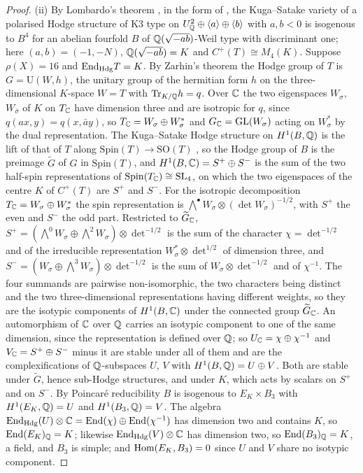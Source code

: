 \begin{proof}
(ii) By Lombardo's theorem \cite[Thms.~6.2, 6.4]{Lom01}, in the form of \cite[Thm.~4.1]{Var25}, the Kuga--Satake variety of a polarised Hodge structure of K3 type on $U_{\mathbb{Q}}^{2}\oplus\langle a\rangle\oplus\langle b\rangle$ with $a,b<0$ is isogenous to $B^{4}$ for an abelian fourfold $B$ of $\mathbb{Q}(\sqrt{-ab})$-Weil type with discriminant one; here $(a,b)=(-1,-N)$, $\mathbb{Q}(\sqrt{-ab})=K$ and $C^{+}(T)\cong M_{4}(K)$. Suppose $\rho(X)=16$ and $\mathrm{End}_{\mathrm{Hdg}}T=K$. By Zarhin's theorem \cite[Thm.~2.3.1]{Zar83} the Hodge group of $T$ is $G=\mathrm{U}(W,h)$, the unitary group of the hermitian form $h$ on the three-dimensional $K$-space $W=T$ with $\mathrm{Tr}_{K/\mathbb{Q}}h=q$. Over $\mathbb{C}$ the two eigenspaces $W_{\sigma}$, $W_{\bar\sigma}$ of $K$ on $T_{\mathbb{C}}$ have dimension three and are isotropic for $q$, since $q(ax,y)=q(x,\bar ay)$, so $T_{\mathbb{C}}=W_{\sigma}\oplus W_{\sigma}^{*}$ and $G_{\mathbb{C}}=\mathrm{GL}(W_{\sigma})$ acting on $W_{\sigma}^{*}$ by the dual representation. The Kuga--Satake Hodge structure on $H^{1}(B,\mathbb{Q})$ is the lift of that of $T$ along $\mathrm{Spin}(T)\to\mathrm{SO}(T)$ \cite[\S5]{vG08}, so the Hodge group of $B$ is the preimage $\widetilde G$ of $G$ in $\mathrm{Spin}(T)$, and $H^{1}(B,\mathbb{C})=S^{+}\oplus S^{-}$ is the sum of the two half-spin representations of $\mathrm{Spin}(T_{\mathbb{C}})\cong\mathrm{SL}_{4}$, on which the two eigenspaces of the centre $K$ of $C^{+}(T)$ are $S^{+}$ and $S^{-}$. For the isotropic decomposition $T_{\mathbb{C}}=W_{\sigma}\oplus W_{\sigma}^{*}$ the spin representation is $\bigwedge^{\bullet}W_{\sigma}\otimes(\det W_{\sigma})^{-1/2}$, with $S^{+}$ the even and $S^{-}$ the odd part. Restricted to $\widetilde G_{\mathbb{C}}$, $S^{+}=(\bigwedge^{0}W_{\sigma}\oplus\bigwedge^{2}W_{\sigma})\otimes\det^{-1/2}$ is the sum of the character $\chi=\det^{-1/2}$ and of the irreducible representation $W_{\sigma}^{*}\otimes\det^{1/2}$ of dimension three, and $S^{-}=(W_{\sigma}\oplus\bigwedge^{3}W_{\sigma})\otimes\det^{-1/2}$ is the sum of $W_{\sigma}\otimes\det^{-1/2}$ and of $\chi^{-1}$. The four summands are pairwise non-isomorphic, the two characters being distinct and the two three-dimensional representations having different weights, so they are the isotypic components of $H^{1}(B,\mathbb{C})$ under the connected group $\widetilde G_{\mathbb{C}}$. An automorphism of $\mathbb{C}$ over $\mathbb{Q}$ carries an isotypic component to one of the same dimension, since the representation is defined over $\mathbb{Q}$; so $U_{\mathbb{C}}=\chi\oplus\chi^{-1}$ and $V_{\mathbb{C}}=S^{+}\oplus S^{-}$ minus it are stable under all of them and are the complexifications of $\mathbb{Q}$-subspaces $U$, $V$ with $H^{1}(B,\mathbb{Q})=U\oplus V$. Both are stable under $\widetilde G$, hence sub-Hodge structures, and under $K$, which acts by scalars on $S^{+}$ and on $S^{-}$. By Poincar\'e reducibility $B$ is isogenous to $E_{K}\times B_{3}$ with $H^{1}(E_{K},\mathbb{Q})=U$ and $H^{1}(B_{3},\mathbb{Q})=V$. The algebra $\mathrm{End}_{\mathrm{Hdg}}(U)\otimes\mathbb{C}=\mathrm{End}(\chi)\oplus\mathrm{End}(\chi^{-1})$ has dimension two and contains $K$, so $\mathrm{End}(E_{K})_{\mathbb{Q}}=K$; likewise $\mathrm{End}_{\mathrm{Hdg}}(V)\otimes\mathbb{C}$ has dimension two, so $\mathrm{End}(B_{3})_{\mathbb{Q}}=K$, a field, and $B_{3}$ is simple; and $\mathrm{Hom}(E_{K},B_{3})=0$ since $U$ and $V$ share no isotypic component.
\end{proof}

